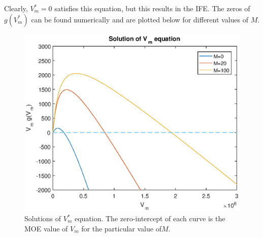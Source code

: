 \documentclass[11pt, oneside]{article}    %
\begin{document}
Clearly, $V_m^* = 0$ satisfies this equation, but this results in the IFE. The zeros of $g(V_m^*)$ can be found numerically and are plotted below for different values of $M$.



\begin{figure}[H]
\centering
\includegraphics[scale=0.65]{V_m_sol.eps}
\caption{Solutions of $V_m^*$ equation. The zero-intercept of each curve is the MOE value of $V_m$ for the particular value of$M$.}
\end{figure}
\end{document}
